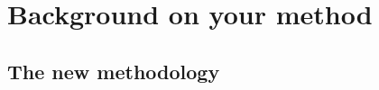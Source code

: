 
\chapter[BACKGROUND METHODOLOGY]{Background on your method}

\newpage
\section{The new methodology}

